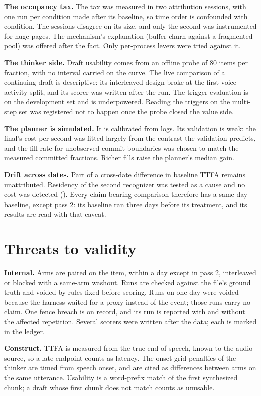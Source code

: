 \textbf{The occupancy tax.} The tax was measured in two attribution sessions,
with one run per condition made after its baseline, so time order is
confounded with condition. The sessions disagree on its size, and only the
second was instrumented for huge pages. The mechanism's explanation (buffer
churn against a fragmented pool) was offered after the fact. Only
per-process levers were tried against it.

\textbf{The thinker side.} Draft usability comes from an offline probe of 80
items per fraction, with no interval carried on the curve. The live
comparison of a continuing draft is descriptive: its interleaved design broke
at the first voice-activity split, and its scorer was written after the run.
The trigger evaluation is on the development set and is underpowered. Reading
the triggers on the multi-step set was registered not to happen once the
probe closed the value side.

\textbf{The planner is simulated.} It is calibrated from logs. Its
validation is weak: the final's cost per second was fitted largely from the
contrast the validation predicts, and the fill rate for unobserved commit
boundaries was chosen to match the measured committed fractions. Richer fills
raise the planner's median gain.

\textbf{Drift across dates.} Part of a cross-date difference in baseline TTFA
remains unattributed. Residency of the second recognizer was tested as a
cause and no cost was detected (\ResidencyTTFA). Every claim-bearing
comparison therefore has a same-day baseline, except pass 2: its baseline ran
three days before its treatment, and its results are read with that caveat.

\section{Threats to validity}
\label{sec:threats}

\textbf{Internal.} Arms are paired on the item, within a day except in pass
2, interleaved or blocked with a same-arm washout. Runs are checked against the file's ground
truth and voided by rules fixed before scoring. Runs on one day were voided
because the harness waited for a proxy instead of the event; those runs carry
no claim. One fence breach is on record, and its run is reported with and
without the affected repetition. Several scorers were written after the
data; each is marked in the ledger.

\textbf{Construct.} TTFA is measured from the true end of speech, known to the
audio source, so a late endpoint counts as latency. The onset-grid penalties
of the thinker are timed from speech onset, and are cited as differences
between arms on the same utterance. Usability is a word-prefix match of the
first synthesized chunk; a draft whose first chunk does not match counts as
unusable.

